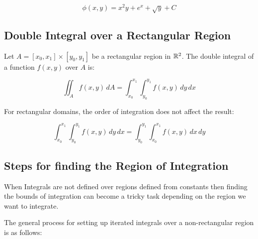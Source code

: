 \[
    \phi(x, y) = x^2y + e^x + \sqrt{y} + C
\]

\subsection{Double Integral over a Rectangular Region}

Let \( A = [x_0, x_1] \times [y_0, y_1] \) be a rectangular region in \( \mathbb{R}^2 \). The double 
integral of a function \( f(x, y) \) over \(A\) is:

\[
    \iint_A f(x, y)\, dA = \int_{x_0}^{x_1} \int_{y_0}^{y_1} f(x, y)\, dy\, dx
\]

For rectangular domains, the order of integration does not affect the result:

\[
    \int_{x_0}^{x_1} \int_{y_0}^{y_1} f(x, y)\, dy\, dx = \int_{y_0}^{y_1} \int_{x_0}^{x_1} 
    f(x, y)\, dx\, dy
\]

\subsection{Steps for finding the Region of Integration}

When Integrals are not defined over regions defined from constants then finding the bounds 
of integration can become a tricky task depending on the region we want to integrate.

The general process for setting up iterated integrals over a non-rectangular region is as follows:

